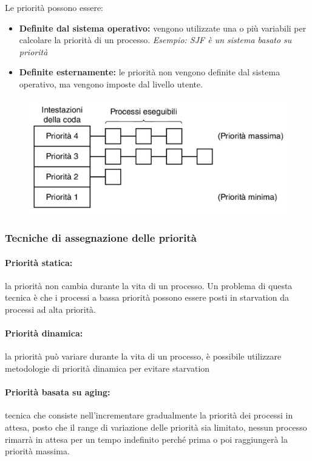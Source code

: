 Le priorità possono essere: 
\begin{itemize}
    \item \textbf{Definite dal sistema operativo:} vengono utilizzate una o più variabili per calcolare la priorità di un processo.
    \textit{Esempio: SJF è un sistema basato su priorità}
    \item \textbf{Definite esternamente:} le priorità non vengono definite dal sistema operativo, ma vengono imposte dal livello utente.
\end{itemize}

\begin{figure} [h]
    \centering
    \includegraphics[width=0.6\linewidth]{Images/Screenshot 2024-12-23 at 17-14-31 so-02.1-scheduling - so-02.1-scheduling.pdf.png}
    \label{fig:enter-label}
\end{figure}

\subsubsection{Tecniche di assegnazione delle priorità}

\paragraph{Priorità statica:} la priorità non cambia durante la vita di un processo. Un problema di questa tecnica è che i processi a bassa priorità possono essere posti in starvation da processi ad alta priorità.

\paragraph{Priorità dinamica:} la priorità può variare durante la vita di un processo, è possibile utilizzare metodologie di priorità dinamica per evitare starvation

\paragraph{Priorità basata su aging:} tecnica che consiste nell'incrementare gradualmente la priorità dei processi
in attesa, posto che il range di variazione delle priorità sia limitato, nessun processo rimarrà in attesa per un tempo indefinito perché prima o poi raggiungerà la priorità massima.


